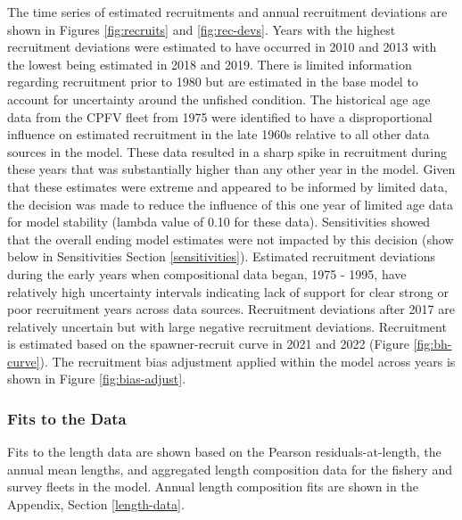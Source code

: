 \documentclass[11pt,
  english,
  letterpaper,
]{article}
\begin{document}
The time series of estimated recruitments and annual recruitment deviations are shown in Figures \ref{fig:recruits} and \ref{fig:rec-devs}. Years with the highest recruitment deviations were estimated to have occurred in 2010 and 2013 with the lowest being estimated in 2018 and 2019. There is limited information regarding recruitment prior to 1980 but are estimated in the base model to account for uncertainty around the unfished condition. The historical age age data from the CPFV fleet from 1975 were identified to have a disproportional influence on estimated recruitment in the late 1960s relative to all other data sources in the model. These data resulted in a sharp spike in recruitment during these years that was substantially higher than any other year in the model. Given that these estimates were extreme and appeared to be informed by limited data, the decision was made to reduce the influence of this one year of limited age data for model stability (lambda value of 0.10 for these data). Sensitivities showed that the overall ending model estimates were not impacted by this decision (show below in Sensitivities Section \ref{sensitivities}). Estimated recruitment deviations during the early years when compositional data began, 1975 - 1995, have relatively high uncertainty intervals indicating lack of support for clear strong or poor recruitment years across data sources. Recruitment deviations after 2017 are relatively uncertain but with large negative recruitment deviations. Recruitment is estimated based on the spawner-recruit curve in 2021 and 2022 (Figure \ref{fig:bh-curve}). The recruitment bias adjustment applied within the model across years is shown in Figure \ref{fig:bias-adjust}.

\hypertarget{fits-to-the-data}{%
\subsubsection{Fits to the Data}\label{fits-to-the-data}}

Fits to the length data are shown based on the Pearson residuals-at-length, the annual mean lengths, and aggregated length composition data for the fishery and survey fleets in the model. Annual length composition fits are shown in the Appendix, Section \ref{length-data}.
\end{document}
